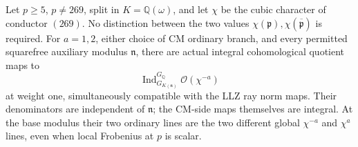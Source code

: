 \begin{proposition}
\label{AC-K29-irregular-ray}
Let \(p\geq5\), \(p\neq269\), split in
\(K=\mathbb Q(\omega)\), and let \(\chi\) be the cubic character
of conductor \((269)\).  No distinction between the two values
\(\chi(\mathfrak p),\chi(\overline{\mathfrak p})\) is required.
For \(a=1,2\), either choice of CM ordinary branch, and every
permitted squarefree auxiliary modulus \(\mathfrak n\), there
are actual integral cohomological quotient maps to
\[
 \operatorname{Ind}_{G_{K(\mathfrak n)}}^{G_{\mathbb Q}}
                   \mathcal O(\chi^{-a})               \tag{CIR.3}
\]
at weight one, simultaneously compatible with the LLZ ray norm
maps.  Their denominators are independent of \(\mathfrak n\);
the CM-side maps themselves are integral.  At the base modulus
their two ordinary lines are the two different global
\(\chi^{-a}\) and \(\chi^{a}\) lines, even when local Frobenius
at \(p\) is scalar.
\end{proposition}

